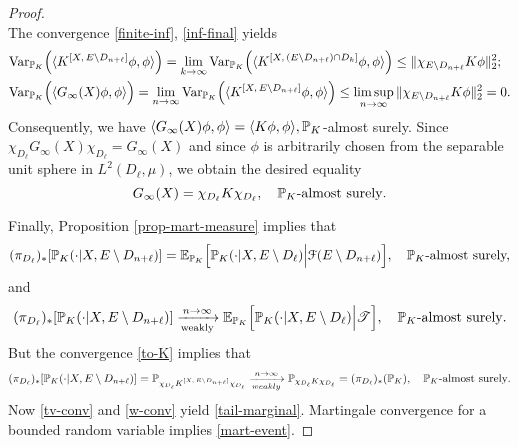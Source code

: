 \documentclass[12pt]{paper}
\numberwithin{theorem}{section}
\numberwithin{figure}{section}
\numberwithin{equation}{section}
\begin{document}
\begin{proof}
\[\]
 The convergence \eqref{finite-inf}, \eqref{inf-final} yields
 \begin{align*}
& \mathrm{Var}_{\mathbb{P}_K}\Big(\langle  K^{[X, \, E\setminus D_{n+\ell} ]} \phi, \phi\rangle \Big) = \lim_{k \to\infty} \mathrm{Var}_{\mathbb{P}_K}\Big(\langle  K^{[X, \, (E\setminus D_{n+\ell} ) \cap D_k]} \phi, \phi\rangle \Big)  \le  \|\chi_{E\setminus D_{n+\ell} } K \phi\|_2^2;
 \\
 & \mathrm{Var}_{\mathbb{P}_K}\Big(  \langle G_\infty(X)\phi, \phi \rangle   \Big)  = \lim_{n\to\infty} \mathrm{Var}_{\mathbb{P}_K}\Big(\langle  K^{[X, \, E\setminus D_{n+\ell} ]} \phi, \phi\rangle \Big)  \le \limsup_{n\to\infty}   \|\chi_{E\setminus D_{n+\ell} } K \phi\|_2^2=0.
 \end{align*}
 Consequently,  we have $\langle G_\infty(X)\phi, \phi \rangle = \langle  K \phi, \phi\rangle, \mathbb{P}_K$-almost surely.
Since $ \chi_{D_\ell} G_\infty(X) \chi_{D_\ell} = G_\infty(X)$ and since $\phi$ is arbitrarily chosen from the separable unit sphere in $L^2(D_\ell, \mu)$, we obtain the desired equality
\[
G_\infty(X) = \chi_{D_\ell} K \chi_{D_\ell}, \quad \text{$\mathbb{P}_K$-almost surely}.
\]

Finally, Proposition \ref{prop-mart-measure} implies that
\[
(\pi_{D_\ell})_{*}[ \mathbb{P}_K(\cdot| X, E\setminus D_{n+\ell} )]= \mathbb{E}_{\mathbb{P}_K}\Big[ \mathbb{P}_K(\cdot | X, E\setminus D_\ell) \Big| \mathcal{F}(E\setminus D_{n+\ell})\Big],  \quad \text{$\mathbb{P}_K$-almost surely,}
\]
and
\begin{align}\label{tv-conv}
(\pi_{D_\ell})_{*}[ \mathbb{P}_K(\cdot| X, E\setminus D_{n+\ell} )] \xrightarrow[\text{weakly}]{n\to\infty}  \mathbb{E}_{\mathbb{P}_K}\Big[ \mathbb{P}_K(\cdot | X, E\setminus D_\ell) \Big| \mathscr{T}\Big], \quad \text{$\mathbb{P}_K$-almost surely}.
\end{align}
But the convergence \eqref{to-K} implies that
\begin{align}\label{w-conv}
(\pi_{D_\ell})_{*}[ \mathbb{P}_K(\cdot| X, E\setminus D_{n+\ell} )]=   \mathbb{P}_{\chi_{D_\ell} K^{[X, \, E\setminus D_{n+\ell}]} \chi_{D_\ell}  } \xrightarrow[weakly]{n\to\infty}  \mathbb{P}_{\chi_{D_\ell}  K \chi_{D_\ell} } = (\pi_{D_\ell})_{*}(\mathbb{P}_K), \quad \text{$\mathbb{P}_K$-almost surely}.
\end{align}
Now \eqref{tv-conv} and \eqref{w-conv}  yield  \eqref{tail-marginal}.
Martingale convergence  for a bounded random variable  implies  \eqref{mart-event}.
\end{proof}
\end{document}

